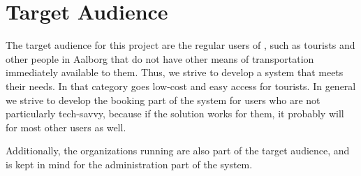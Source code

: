 \section{Target Audience}\label{sec:ta}
The target audience for this project are the regular users of \bycykelwithoutspace, such as tourists and other people in Aalborg that do not have other means of transportation immediately available to them. 
Thus, we strive to develop a system that meets their needs.
In that category goes low-cost and easy access for tourists.
In general we strive to develop the booking part of the system for users who are not particularly tech-savvy, because if the solution works for them, it probably will for most other users as well.

Additionally, the organizations running \bycykel are also part of the target audience, and is kept in mind for the administration part of the system.